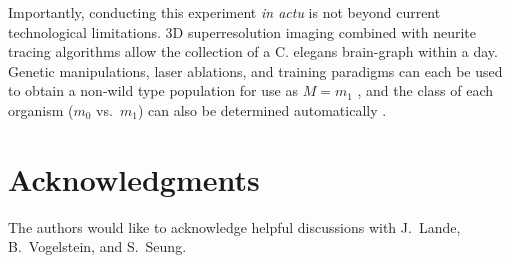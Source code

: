 \documentclass{article}
\begin{document}
Importantly, conducting this experiment {\it in actu} is not beyond current technological limitations. 3D superresolution imaging \cite{VaziriShank08} combined with neurite tracing algorithms \cite{HelmstaedterDenk08,Mishchenko09,LuLichtman09} allow the collection of a C. elegans brain-graph within a day. Genetic manipulations, laser ablations, and training paradigms can each be used to obtain a non-wild type population for use as $M=m_1$ \cite{deBonoMaricq05}, and the class of each organism ($m_0$ vs.~$m_1$) can also be determined automatically \cite{BuckinghamSattelle08}.

\clearpage




\section*{Acknowledgments}

The authors would like to acknowledge helpful discussions with J.~Lande, B.~Vogelstein, and S.~Seung. 


% 


\end{document}
